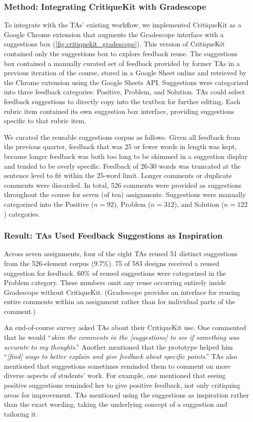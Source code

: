 \subsubsection{Method: Integrating CritiqueKit with Gradescope}
To integrate with the TAs' existing workflow, we implemented CritiqueKit as a Google Chrome extension that augments the Gradescope interface with a suggestions box (\autoref{fig:critiquekit_gradescope}). This version of CritiqueKit contained only the suggestions box to explore feedback reuse. The suggestions box contained a manually curated set of feedback provided by former TAs in a previous iteration of the course, stored in a Google Sheet online and retrieved by the Chrome extension using the Google Sheets API. Suggestions were categorized into three feedback categories: Positive, Problem, and Solution. TAs could select feedback suggestions to directly copy into the textbox for further editing. Each rubric item contained its own suggestion box interface, providing suggestions specific to that rubric item.

We curated the reusable suggestions corpus as follows. Given all feedback from the previous quarter, feedback that was 25 or fewer words in length was kept, because longer feedback was both too long to be skimmed in a suggestion display and tended to be overly specific. Feedback of 26-30 words was truncated at the sentence level to fit within the 25-word limit. Longer comments or duplicate comments were discarded. In total, 526 comments were provided as suggestions throughout the course for seven (of ten) assignments. Suggestions were manually categorized into the Positive ($n = 92$), Problem ($n = 312$), and Solution ($n = 122$) categories.

\subsubsection{Result: TAs Used Feedback Suggestions as Inspiration}
Across seven assignments, four of the eight TAs reused 51 distinct suggestions from the 526-element corpus (9.7\%). 75 of 583 designs received a reused suggestion for feedback. 60\% of reused suggestions were categorized in the Problem category. These numbers omit any reuse occurring entirely inside Gradescope without CritiqueKit. (Gradescope provides an interface for reusing entire comments within an assignment rather than for individual parts of the comment.) 

An end-of-course survey asked TAs about their CritiqueKit use. One commented that he would ``\textit{skim the comments in the [suggestions] to see if something was accurate to my thoughts}.'' Another mentioned that the prototype helped him ``\textit{[find] ways to better explain and give feedback about specific points}.'' TAs also mentioned that suggestions sometimes reminded them to comment on more diverse aspects of students' work. For example, one mentioned that seeing positive suggestions reminded her to give positive feedback, not only critiquing areas for improvement. TAs mentioned using the suggestions as inspiration rather than the exact wording, taking the underlying concept of a suggestion and tailoring it.

